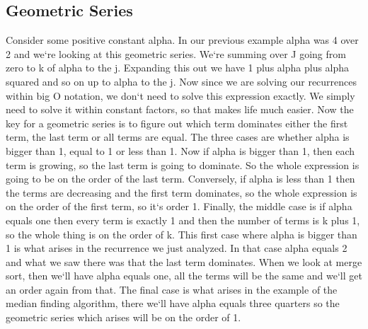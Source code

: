 \subsection{Geometric Series}
Consider some positive constant alpha.
In our previous example alpha was 4 over 2 and we`re looking at this geometric series.
We`re summing over J going from zero to k of alpha to the j.
Expanding this out we have 1 plus alpha plus alpha squared and so on up to alpha to the j.
Now since we are solving our recurrences within big O notation, we don`t need to solve this expression exactly.
We simply need to solve it within constant factors, so that makes life much easier.
Now the key for a geometric series is to figure out which term dominates either the first term, the last term or all terms are equal.
The three cases are whether alpha is bigger than 1, equal to 1 or less than 1.
Now if alpha is bigger than 1, then each term is growing, so the last term is going to dominate.
So the whole expression is going to be on the order of the last term.
Conversely, if alpha is less than 1 then the terms are decreasing and the first term dominates, so the whole expression is on the order of the first term, so it`s order 1.
Finally, the middle case is if alpha equals one then every term is exactly 1 and then the number of terms is k plus 1, so the whole thing is on the order of k.
This first case where alpha is bigger than 1 is what arises in the recurrence we just analyzed.
In that case alpha equals 2 and what we saw there was that the last term dominates.
When we look at merge sort, then we`ll have alpha equals one, all the terms will be the same and we`ll get an order again from that.
The final case is what arises in the example of the median finding algorithm, there we`ll have alpha equals three quarters so the geometric series which arises will be on the order of 1.


